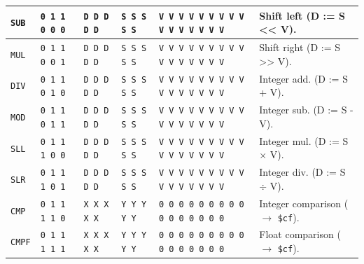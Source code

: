 \documentclass{report}
\begin{document}
{\begin{center}
\begin{tabular}[ht]{
	| p{} | p{} | p{} | p{}
	| p{} | p{} |
}
	\texttt{SUB} & \texttt{0 1 1 0 0 0} & \texttt{D D D D D} & \texttt{S S S S S} &
		\texttt{V V V V V V V V V V V V V V V V} & Shift left (D := S << V). \\
	\hline
	
	\texttt{MUL} & \texttt{0 1 1 0 0 1} & \texttt{D D D D D} & \texttt{S S S S S} &
		\texttt{V V V V V V V V V V V V V V V V} & Shift right (D := S >> V). \\
	\hline
	
	\texttt{DIV} & \texttt{0 1 1 0 1 0} & \texttt{D D D D D} & \texttt{S S S S S} &
		\texttt{V V V V V V V V V V V V V V V V} & Integer add. (D := S + V). \\
	\hline
	
	\texttt{MOD} & \texttt{0 1 1 0 1 1} & \texttt{D D D D D} & \texttt{S S S S S} &
		\texttt{V V V V V V V V V V V V V V V V} & Integer sub. (D := S - V). \\
	\hline
	
	\texttt{SLL} & \texttt{0 1 1 1 0 0} & \texttt{D D D D D} & \texttt{S S S S S} &
		\texttt{V V V V V V V V V V V V V V V V} & Integer mul. (D := S $\times$ V). \\
	\hline
	
	\texttt{SLR} & \texttt{0 1 1 1 0 1} & \texttt{D D D D D} & \texttt{S S S S S} &
		\texttt{V V V V V V V V V V V V V V V V} & Integer div. (D := S $\div$ V). \\
	\hline
	
	\texttt{CMP} & \texttt{0 1 1 1 1 0} & \texttt{X X X X X} & \texttt{Y Y Y Y Y} &
		\texttt{0 0 0 0 0 0 0 0 0 0 0 0 0 0 0 0} & Integer comparison ($\rightarrow$ \texttt{\$cf}). \\
	\hline
	
	\texttt{CMPF} & \texttt{0 1 1 1 1 1} & \texttt{X X X X X} & \texttt{Y Y Y Y Y} &
		\texttt{0 0 0 0 0 0 0 0 0 0 0 0 0 0 0 0} & Float comparison ($\rightarrow$ \texttt{\$cf}). \\
	\hline
\end{tabular}
\end{center}
}
\end{document}
